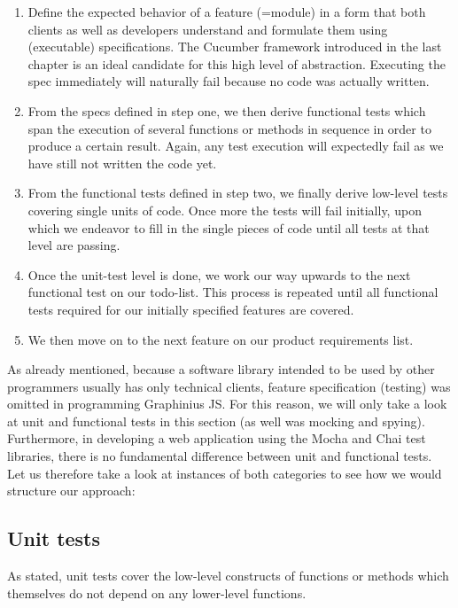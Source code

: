 	\begin{enumerate}
		\item Define the expected behavior of a feature (=module) in a form that both clients as well as developers understand and formulate them using (executable) specifications. The Cucumber framework introduced in the last chapter is an ideal candidate for this high level of abstraction. Executing the spec immediately will naturally fail because no code was actually written.
		\item From the specs defined in step one, we then derive functional tests which span the execution of several functions or methods in sequence in order to produce a certain result. Again, any test execution will expectedly fail as we have still not written the code yet.
		\item From the functional tests defined in step two, we finally derive low-level tests covering single units of code. Once more the tests will fail initially, upon which we endeavor to fill in the single pieces of code until all tests at that level are passing.
		\item Once the unit-test level is done, we work our way upwards to the next functional test on our todo-list. This process is repeated until all functional tests required for our initially specified features are covered.
		\item We then move on to the next feature on our product requirements list.
	\end{enumerate}
	
	 As already mentioned, because a software library intended to be used by other programmers usually has only technical clients, feature specification (testing) was omitted in programming Graphinius JS. For this reason, we will only take a look at unit and functional tests in this section (as well was mocking and spying). Furthermore, in developing a web application using the Mocha and Chai test libraries, there is no fundamental difference between unit and functional tests. Let us therefore take a look at instances of both categories to see how we would structure our approach:
	
	\subsection{Unit tests}
	\label{ssect:unittests}
	
	As stated, unit tests cover the low-level constructs of functions or methods which themselves do not depend on any lower-level functions.
	
